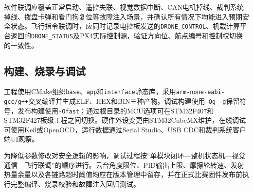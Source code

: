 软件联调应覆盖正常启动、遥控失联、视觉数据中断、CAN电机掉线、裁判系统掉线、拨盘卡弹和看门狗复位等故障注入场景，并确认所有情况下均能进入预期安全状态。飞行指令联调时，应同时记录电控板发送的\texttt{DRONE\_CONTROL}、机载计算平台返回的\texttt{DRONE\_STATUS}及PX4实际控制源，验证方向位、航点编号和控制权切换的一致性。

\subsection{构建、烧录与调试}

工程使用CMake组织\texttt{base}、\texttt{app}和\texttt{interface}静态库，采用\texttt{arm-none-eabi-gcc/g++}交叉编译并生成ELF、HEX和BIN三种产物。调试构建使用\texttt{-Og -g}保留符号，发布构建使用\texttt{-Ofast}；通过根目录的MCU选项可在STM32F407和STM32F427板级工程之间切换。硬件外设变更由STM32CubeMX维护，在线调试可使用Keil或OpenOCD，运行数据通过Serial Studio、USB CDC和裁判系统客户端UI观察。

为降低参数修改对安全逻辑的影响，调试过程按“单模块闭环---整机状态机---视觉通信---飞行联调”的顺序进行。云台角度限位、PID输出上限、摩擦轮转速、发射热量余量以及各链路超时阈值均应在版本管理中留存，并在正式比赛固件发布前执行完整编译、烧录校验和故障注入回归测试。

\clearpage

